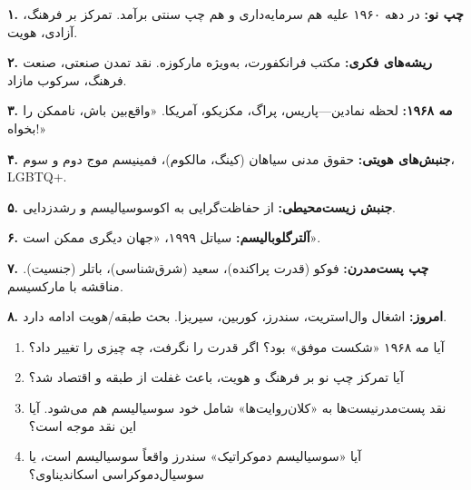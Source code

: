 
\newpage

\begin{summarybox}

\textbf{۱. چپ نو:} در دهه ۱۹۶۰ علیه هم سرمایه‌داری و هم چپ سنتی برآمد. تمرکز بر فرهنگ، آزادی، هویت.

\textbf{۲. ریشه‌های فکری:} مکتب فرانکفورت، به‌ویژه مارکوزه. نقد تمدن صنعتی، صنعت فرهنگ، سرکوب مازاد.

\textbf{۳. مه ۱۹۶۸:} لحظه نمادین—پاریس، پراگ، مکزیکو، آمریکا. «واقع‌بین باش، ناممکن را بخواه!»

\textbf{۴. جنبش‌های هویتی:} حقوق مدنی سیاهان (کینگ، مالکوم)، فمینیسم موج دوم و سوم، LGBTQ+.

\textbf{۵. جنبش زیست‌محیطی:} از حفاظت‌گرایی به اکوسوسیالیسم و رشدزدایی.

\textbf{۶. آلترگلوبالیسم:} سیاتل ۱۹۹۹، «جهان دیگری ممکن است».

\textbf{۷. چپ پست‌مدرن:} فوکو (قدرت پراکنده)، سعید (شرق‌شناسی)، باتلر (جنسیت). مناقشه با مارکسیسم.

\textbf{۸. امروز:} اشغال وال‌استریت، سندرز، کوربین، سیریزا. بحث طبقه/هویت ادامه دارد.

\end{summarybox}

\vspace{20pt}

\begin{questionbox}

\begin{enumerate}[nosep, rightmargin=1cm]
    \item آیا مه ۱۹۶۸ «شکست موفق» بود؟ اگر قدرت را نگرفت، چه چیزی را تغییر داد؟

    \item آیا تمرکز چپ نو بر فرهنگ و هویت، باعث غفلت از طبقه و اقتصاد شد؟

    \item نقد پست‌مدرنیست‌ها به «کلان‌روایت‌ها» شامل خود سوسیالیسم هم می‌شود. آیا این نقد موجه است؟

    \item آیا «سوسیالیسم دموکراتیک» سندرز واقعاً سوسیالیسم است، یا سوسیال‌دموکراسی اسکاندیناوی؟
\end{enumerate}

\end{questionbox}

